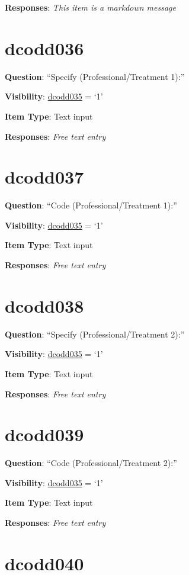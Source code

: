 \documentclass[]{book}
\begin{document}
\textbf{Responses}: \emph{This item is a markdown message}

\hypertarget{dcodd036}{%
\section{dcodd036}\label{dcodd036}}

\textbf{Question}: ``Specify (Professional/Treatment 1):''

\textbf{Visibility}: \protect\hyperlink{dcodd035}{dcodd035} = `1'

\textbf{Item Type}: Text input

\textbf{Responses}: \emph{Free text entry}

\hypertarget{dcodd037}{%
\section{dcodd037}\label{dcodd037}}

\textbf{Question}: ``Code (Professional/Treatment 1):''

\textbf{Visibility}: \protect\hyperlink{dcodd035}{dcodd035} = `1'

\textbf{Item Type}: Text input

\textbf{Responses}: \emph{Free text entry}

\hypertarget{dcodd038}{%
\section{dcodd038}\label{dcodd038}}

\textbf{Question}: ``Specify (Professional/Treatment 2):''

\textbf{Visibility}: \protect\hyperlink{dcodd035}{dcodd035} = `1'

\textbf{Item Type}: Text input

\textbf{Responses}: \emph{Free text entry}

\hypertarget{dcodd039}{%
\section{dcodd039}\label{dcodd039}}

\textbf{Question}: ``Code (Professional/Treatment 2):''

\textbf{Visibility}: \protect\hyperlink{dcodd035}{dcodd035} = `1'

\textbf{Item Type}: Text input

\textbf{Responses}: \emph{Free text entry}

\hypertarget{dcodd040}{%
\section{dcodd040}\label{dcodd040}}
\end{document}
